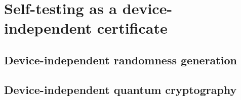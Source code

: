 \chapter{Self-testing as a device-independent certificate}

\section{Device-independent randomness generation}

\section{Device-independent quantum cryptography}
